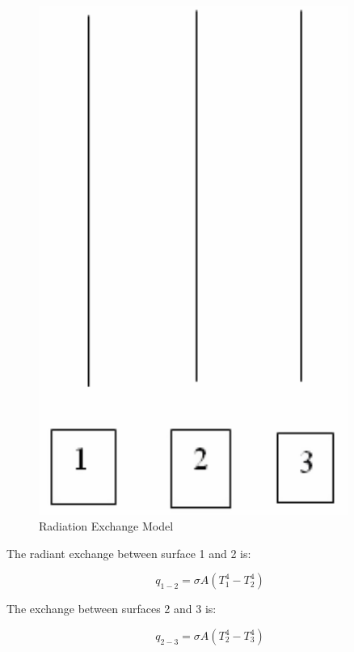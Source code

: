 \begin{figure}[hbtp] %
\centering
\includegraphics[width=0.9\textwidth, height=0.9\textheight, keepaspectratio=true]{media/image392.png}
\caption{Radiation Exchange Model \protect \label{fig:radiation-exchange-model}}
\end{figure}

The radiant exchange between surface 1 and 2 is:

\begin{equation}
{q_{1 - 2}} = \sigma A\left( {T_1^4 - T_2^4} \right)
\end{equation}

The exchange between surfaces 2 and 3 is:

\begin{equation}
{q_{2 - 3}} = \sigma A\left( {T_2^4 - T_3^4} \right)
\end{equation}

